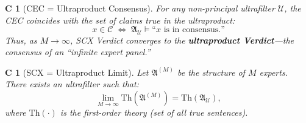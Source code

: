 \documentclass[12pt,a4paper]{article}
\newtheorem{corollary}[theorem]Corollary
\theoremstyle{remark}
\newcommand{\CEC}{\mathcal{C}}
\newcommand{\Th}{\mathrm{Th}}
\newcommand{\Ultrafilter}{\mathcal{U}}
\newcommand{\Struct}{\mathfrak{A}}
\begin{document}
\begin{corollary}[CEC = Ultraproduct Consensus]\label{cor:cec_ultra}
For any non-principal ultrafilter \(\Ultrafilter\), the CEC coincides with the set of claims true in the ultraproduct:
\begin{equation}
    x \in \CEC \;\Longleftrightarrow\; \Struct_{\Ultrafilter} \models \text{``}x\text{ is in consensus.''}
\end{equation}
Thus, as \(M \to \infty\), SCX Verdict converges to the \textbf{ultraproduct Verdict}---the consensus of an ``infinite expert panel.''
\end{corollary}

\begin{corollary}[SCX = Ultraproduct Limit]\label{cor:limit_ultra}
Let \(\Struct^{(M)}\) be the structure of \(M\) experts. There exists an ultrafilter such that:
\begin{equation}
    \lim_{M \to \infty} \Th(\Struct^{(M)}) = \Th(\Struct_{\Ultrafilter}),
\end{equation}
where \(\Th(\cdot)\) is the first-order theory (set of all true sentences).
\end{corollary}
\end{document}
